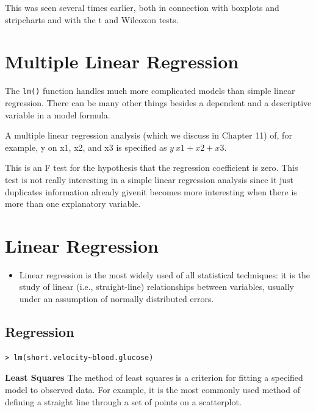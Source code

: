 \documentclass[]{report}
\begin{document}
This was seen several times earlier, both in connection with
boxplots and stripcharts and with the t and Wilcoxon tests.



\section{Multiple Linear Regression}
The \texttt{lm()} function handles much more
complicated models than simple linear regression. There can be many other things besides a dependent and a descriptive variable in a model formula.

A multiple linear regression analysis (which we discuss in Chapter
11) of, for example, y on x1, x2, and x3 is specified as $y ~ x1 +
x2 + x3$.


This is an F test for the hypothesis that the regression coefficient is zero. This test is not really interesting in a
simple linear regression analysis since it just duplicates information already givenit becomes more interesting when there is more than one explanatory variable.







\section*{Linear Regression}
\begin{itemize}
	\item Linear regression is the most widely used of all statistical techniques: it is the study of linear (i.e., straight-line) relationships between variables, usually under an assumption of normally distributed errors.
\end{itemize}

\subsection{Regression}

\begin{verbatim}
> lm(short.velocity~blood.glucose)
\end{verbatim}





\textbf{Least Squares}
The method of least squares is a criterion for fitting a specified model to observed data.
For example, it is the most commonly used method of defining a straight line through a set of points on a scatterplot.
\end{document}
